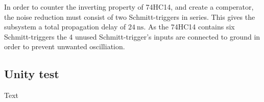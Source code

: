 In order to counter the inverting property of 74HC14, and create a comperator, the noise reduction  must consist of two Schmitt-triggers in series. This gives the subsystem a total propagation delay of $\SI{24}{\nano \second}$. As the 74HC14 contains six Schmitt-triggers the 4 unused Schmitt-trigger's inputs are connected to ground in order to prevent unwanted oscilliation.

\subsection{Unity test}
Text